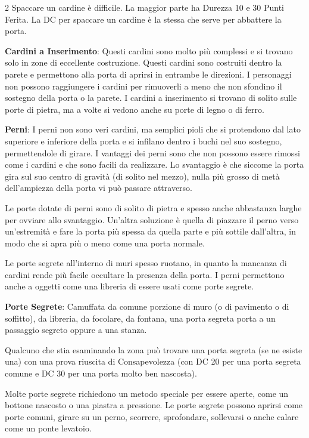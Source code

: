 \begin{multicols}{2}
Spaccare un cardine è difficile. La maggior parte ha Durezza 10 e 30 Punti Ferita. La DC per spaccare un cardine è la stessa che serve per abbattere la porta.


\textbf{Cardini a Inserimento}: Questi cardini sono molto più complessi e si trovano solo in zone di eccellente costruzione. Questi cardini sono costruiti dentro la parete e permettono alla porta di aprirsi in entrambe le direzioni. I personaggi non possono raggiungere i cardini per rimuoverli a meno che non sfondino il sostegno della porta o la parete. I cardini a inserimento si trovano di solito sulle porte di pietra, ma a volte si vedono anche su porte di legno o di ferro.

\textbf{Perni}: I perni non sono veri cardini, ma semplici pioli che si protendono dal lato superiore e inferiore della porta e si infilano dentro i buchi nel suo sostegno, permettendole di girare. I vantaggi dei perni sono che non possono essere rimossi come i cardini e che sono facili da realizzare. Lo svantaggio è che siccome la porta gira sul suo centro di gravità (di solito nel mezzo), nulla più grosso di metà dell'ampiezza della porta vi può passare attraverso.

Le porte dotate di perni sono di solito di pietra e spesso anche abbastanza larghe per ovviare allo svantaggio. Un'altra soluzione è quella di piazzare il perno verso un'estremità e fare la porta più spessa da quella parte e più sottile dall'altra, in modo che si apra più o meno come una porta normale.

Le porte segrete all'interno di muri spesso ruotano, in quanto la mancanza di cardini rende più facile occultare la presenza della porta. I perni permettono anche a oggetti come una libreria di essere usati come porte segrete.

\textbf{Porte Segrete}: Camuffata da comune porzione di muro (o di pavimento o di soffitto), da libreria, da focolare, da fontana, una porta segreta porta a un passaggio segreto oppure a una stanza.

Qualcuno che stia esaminando la zona può trovare una porta segreta (se ne esiste una) con una prova riuscita di Consapevolezza (con DC 20 per una porta segreta comune e DC 30 per una porta molto ben nascosta).

Molte porte segrete richiedono un metodo speciale per essere aperte, come un bottone nascosto o una piastra a pressione. Le porte segrete possono aprirsi come porte comuni, girare su un perno, scorrere, sprofondare, sollevarsi o anche calare come un ponte levatoio.


\end{multicols}
